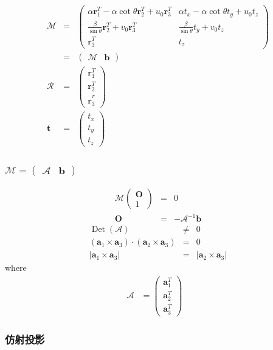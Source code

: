 \documentclass{beamer}
\newcommand{\cdummy}{\cdot}
\newcommand{\tmmathbf}[1]{\ensuremath{\boldsymbol{#1}}}
\newcommand{\tmop}[1]{\ensuremath{\operatorname{#1}}}
\begin{document}
{{\begin{frame}
  
  \begin{eqnarray*}
    \mathcal{M} & = & \left(\begin{array}{cc}
      \alpha \tmmathbf{r}_1^T - \alpha \cot \theta \tmmathbf{r}_2^T + u_0
      \tmmathbf{r}_3^T & \alpha t_x - \alpha \cot \theta t_y + u_0 t_z\\
      \frac{\beta}{\sin \theta} \tmmathbf{r}_2^T + v_0 \tmmathbf{r}_3^T &
      \frac{\beta}{\sin \theta} t_y + v_0 t_z\\
      \tmmathbf{r}_3^T & t_z
    \end{array}\right)\\
    & = & \left(\begin{array}{cc}
      \mathcal{M} & \tmmathbf{b}
    \end{array}\right)\\
    \mathcal{R} & = & \left(\begin{array}{c}
      \tmmathbf{r}_1^T\\
      \tmmathbf{r}_2^T\\
      \tmmathbf{r}_3^{^T}
    \end{array}\right)\\
    \tmmathbf{t} & = & \left(\begin{array}{c}
      t_x\\
      t_y\\
      t_z
    \end{array}\right)
  \end{eqnarray*}
\end{frame}}{\begin{frame}
  \frametitle{$\mathcal{M}= \left(\begin{array}{cc}
    \mathcal{A} & \tmmathbf{b}
  \end{array}\right)$}
  \begin{eqnarray*}
    \mathcal{M} \left(\begin{array}{c}
      \tmmathbf{O}\\
      1
    \end{array}\right) & = & 0\\
    \tmmathbf{O} & = & -\mathcal{A}^{- 1} \tmmathbf{b}
  \end{eqnarray*}
  \begin{eqnarray*}
    \tmop{Det} (\mathcal{A}) & \neq & 0\\
    (\tmmathbf{a}_1 \times \tmmathbf{a}_3) \cdummy (\tmmathbf{a}_2 \times
    \tmmathbf{a}_3) & = & 0\\
    | \tmmathbf{a}_1 \times \tmmathbf{a}_3 | & = & | \tmmathbf{a}_2 \times
    \tmmathbf{a}_3 |
  \end{eqnarray*}
  where
  \begin{eqnarray*}
    \mathcal{A} & = \left(\begin{array}{c}
      \tmmathbf{a}_1^T\\
      \tmmathbf{a}_2^T\\
      \tmmathbf{a}_3^T
    \end{array}\right) & 
  \end{eqnarray*}
\end{frame}}{\begin{frame}
  \frametitle{仿射投影}
  

\end{frame}}}
\end{document}
